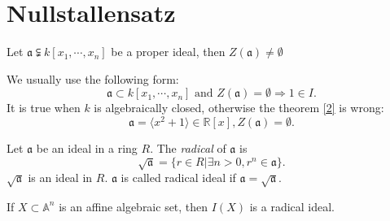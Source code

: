 \section{Nullstallensatz}
\begin{theorem}\label{2}
	Let $ \mathfrak{a}\subsetneqq k[x_1,\cdots,x_n] $ be a proper ideal, then $ Z(\mathfrak{a})\neq \emptyset $
\end{theorem}
\begin{remark}
	We usually use the following form:
	$$
		\mathfrak{a}\subset k[x_1,\cdots,x_n] \text{ and } Z(\mathfrak{a})=\emptyset\Rightarrow 1\in I.
	$$
	It is true when $ k $ is algebraically closed, otherwise the theorem \ref{2} is wrong:
	$$
		\mathfrak{a}=\langle x^2+1\rangle \in \mathbb{R}[x], Z(\mathfrak{a})=\emptyset.
	$$
\end{remark}
\begin{definition}
	Let $ \mathfrak{a} $ be an ideal in a ring $ R $. The \textit{radical} of $ \mathfrak{a} $ is
	$$
		\sqrt{\mathfrak{a}}=\{ r\in R|\exists n>0, r^n\in \mathfrak{a} \}.
	$$
	$ \sqrt{\mathfrak{a}} $ is an ideal in $ R $.
	$ \mathfrak{a} $ is called radical ideal if $ \mathfrak{a}=\sqrt{\mathfrak{a}} $.
\end{definition}
\begin{remark}
	If $ X\subset \mathbb{A}^n $ is an affine algebraic set, then $ I(X) $ is a radical ideal.
\end{remark}

